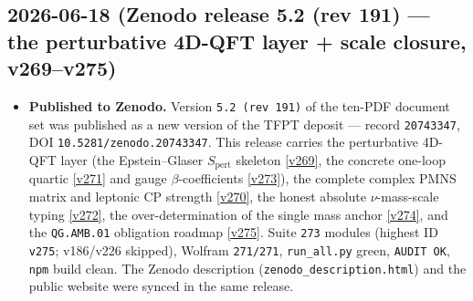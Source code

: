 \subsection*{2026-06-18 (Zenodo release 5.2 (rev 191) --- the perturbative 4D-QFT layer + scale closure, v269--v275)}
\begin{itemize}
\item \textbf{Published to Zenodo.} Version \texttt{5.2 (rev 191)} of the ten-PDF document set was published
  as a new version of the TFPT deposit --- record \texttt{20743347}, DOI \texttt{10.5281/zenodo.20743347}.
  This release carries the perturbative 4D-QFT layer (the Epstein--Glaser $S_{\mathrm{pert}}$ skeleton
  \vref{v269}, the concrete one-loop quartic \vref{v271} and gauge $\beta$-coefficients \vref{v273}), the
  complete complex PMNS matrix and leptonic CP strength \vref{v270}, the honest absolute $\nu$-mass-scale
  typing \vref{v272}, the over-determination of the single mass anchor \vref{v274}, and the \texttt{QG.AMB.01}
  obligation roadmap \vref{v275}. Suite \texttt{273} modules (highest ID \texttt{v275}; v186/v226 skipped),
  Wolfram \texttt{271/271}, \texttt{run\_all.py} green, \texttt{AUDIT OK}, \texttt{npm} build clean. The Zenodo
  description (\texttt{zenodo\_description.html}) and the public website were synced in the same release.
\end{itemize}

